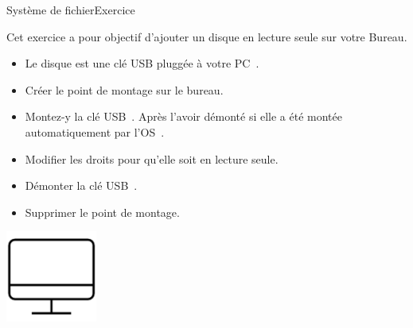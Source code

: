 \documentclass{beamer}
\begin{document}
    \begin{frame}{Système de fichier}{Exercice \execcounterdispinc}
        \setcounter{exemountcounter}{\value{execounter}}
        \addtocounter{exemountcounter}{1}
        Cet exercice a pour objectif d'ajouter un disque en lecture seule sur votre Bureau.
        \begin{itemize}
            \item Le disque est une clé USB pluggée à votre PC~.
            \item Créer le point de montage sur le bureau.
            \item Montez-y la clé USB~.
            Après l'avoir démonté si elle a été montée automatiquement par l'OS~.
            \item Modifier les droits pour qu'elle soit en lecture seule.
            \item Démonter la clé USB~.
            \item Supprimer le point de montage.
        \end{itemize}
        \bigbreak
        \centering
        \includegraphics[width=3cm]{image/desktop}
    \end{frame}
\end{document}
